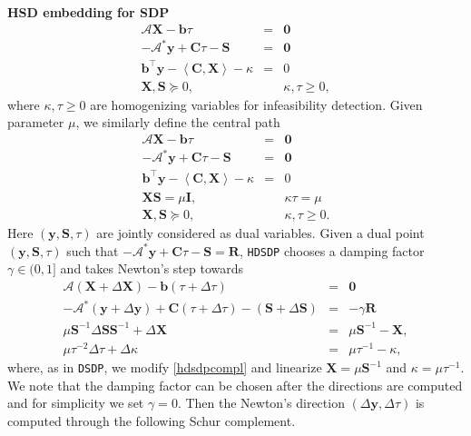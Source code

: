 \documentclass[10pt]{article}
\begin{document}
{{\textbf{HSD embedding for SDP}}
\begin{eqnarray}
  \mathcal{A} \mathbf{X} - \mathbf{b} \tau & = & \textbf{0} \nonumber\\
  - \mathcal{A}^{\ast} \mathbf{y} + \mathbf{C} \tau - \mathbf{S} & = & \textbf{0}  \\
  \mathbf{b}^{\top} \mathbf{y} - \left\langle \mathbf{C}, \mathbf{X} \right\rangle - \kappa & = & 0 \nonumber\\
  \mathbf{X}, \mathbf{S} \succeq 0, &  & \kappa, \tau \geq 0 \nonumber,
\end{eqnarray}
where $\kappa, \tau \geq 0$ are homogenizing variables for infeasibility
detection. Given parameter $\mu$, we similarly define the central path
\begin{eqnarray}
  \mathcal{A} \mathbf{X} - \mathbf{b} \tau & = & \textbf{0} \nonumber \\
  - \mathcal{A}^{\ast} \mathbf{y} + \mathbf{C} \tau - \mathbf{S} & = & \textbf{0} \nonumber \\
  \mathbf{b}^{\top} \mathbf{y} - \left\langle \mathbf{C}, \mathbf{X} \right\rangle - \kappa & = & 0 \nonumber \\
  \mathbf{X} \mathbf{S} = \mu \mathbf{I}, &  & \kappa \tau = \mu \label{hdsdpcompl} \\
  \mathbf{X}, \mathbf{S} \succeq 0, &  & \kappa, \tau \geq 0. \nonumber
\end{eqnarray}
Here $\left( \mathbf{y}, \mathbf{S}, \tau \right)$ are jointly considered as dual variables.
Given a dual point $\left( \mathbf{y}, \mathbf{S}, \tau \right)$ such that $- \mathcal{A}^{\ast} \mathbf{y} +
\mathbf{C} \tau - \mathbf{S} = \mathbf{R}$, {{\texttt{HDSDP}}} chooses a damping factor $\gamma \in
(0, 1]$ and takes Newton's step towards
\begin{eqnarray*}
  \mathcal{A} \left( \mathbf{X} + \Delta \mathbf{X} \right) - \mathbf{b} (\tau + \Delta \tau) & = & \textbf{0}\\
  -\mathcal{A}^{\ast} \left( \mathbf{y} + \Delta \mathbf{y} \right) + \mathbf{C} (\tau + \Delta \tau)
  - \left( \mathbf{S} + \Delta \mathbf{S} \right) & = & - \gamma \mathbf{R}\\
  \mu \mathbf{S}^{- 1} \Delta \mathbf{S} \mathbf{S}^{- 1} + \Delta \mathbf{X} & = & \mu \mathbf{S}^{- 1} - \mathbf{X},\\
  \mu \tau^{- 2} \Delta \tau + \Delta \kappa & = & \mu \tau^{- 1} - \kappa,
\end{eqnarray*}
where, as in {{\texttt{DSDP}}}, we modify \eqref{hdsdpcompl} and linearize $\mathbf{X} = \mu \mathbf{S}^{- 1}$ and $\kappa
= \mu \tau^{- 1}$. We note that the damping factor can be chosen after the
directions are computed and for simplicity we set $\gamma = 0$. Then the
Newton's direction $\left( \Delta \mathbf{y}, \Delta \tau \right)$ is computed through
the following Schur complement.

}
\end{document}
